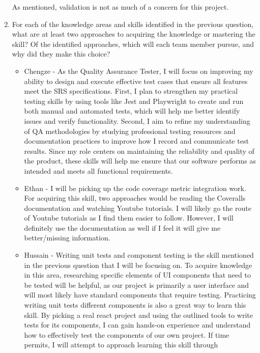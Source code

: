 \documentclass[12pt, titlepage]{article}
\begin{document}
\begin{enumerate}
    As mentioned, validation is not as much of a concern for this project.

  \item For each of the knowledge areas and skills identified in the previous
  question, what are at least two approaches to acquiring the knowledge or
  mastering the skill?  Of the identified approaches, which will each team
  member pursue, and why did they make this choice?
  \begin{itemize}
    \item Chengze - As the Quality Assurance Tester, I will focus on improving my 
    ability to design and execute effective test cases that ensure all features 
    meet the SRS specifications. First, I plan to strengthen my practical testing 
    skills by using tools like Jest and Playwright to create and run both manual 
    and automated tests, which will help me better identify issues and verify functionality. 
    Second, I aim to refine my understanding of QA methodologies by studying professional 
    testing resources and documentation practices to improve how I record and communicate 
    test results. Since my role centers on maintaining the reliability and quality of the 
    product, these skills will help me ensure that our software performs as intended and 
    meets all functional requirements.
    \item Ethan - I will be picking up the code coverage metric integration
      work. For acquiring this skill, two approaches would be reading the
      Coveralls documentation and watching Youtube tutorials. I will likely go
      the route of Youtube tutorials as I find them easier to follow. However,
      I will definitely use the documentation as well if I feel it will give me
      better/missing information.
    \item Hussain - Writing unit tests and component testing is the skill
    mentioned in the previous question that I will be focusing on. To acquire
    knowledge in this area, researching specific elements of UI components that
    need to be tested will be helpful, as our project is primarily a user
    interface and will most likely have standard components that require testing.
    Practicing writing unit tests different components is also a great way to
    learn this skill. By picking a real react project and using the outlined
    tools to write tests for its components, I can gain hands-on experience
    and understand how to effectively test the components of our own project.
    If time permits, I will attempt to approach learning this skill through

\end{itemize}
\end{enumerate}
\end{document}
